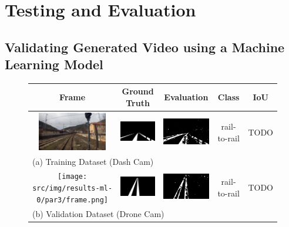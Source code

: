 \chapter{Testing and Evaluation}
\label{chapter:testing-and-evaluation}

\section{Validating Generated Video using a Machine Learning Model}
\label{sec:evaluate-ml}


\begin{figure}
\begin{tabular}{ccccc}
  Frame & Ground Truth & Evaluation & Class & IoU \\ \hline
  \includegraphics[width=30mm]{src/img/results-ml-0/par4/frame.jpg} & 
  \includegraphics[width=30mm]{src/img/results-ml-0/par4/seg.jpeg} & 
  \includegraphics[width=30mm]{src/img/results-ml-0/par4/det.png} &
  rail-to-rail & TODO \\
  \multicolumn{5}{l}{(a) Training Dataset (Dash Cam) } \\ \hline
  
  \texttt{[image: src/img/results-ml-0/par3/frame.png]} & 
  \includegraphics[width=30mm]{src/img/results-ml-0/par3/seg.png} & 
  \includegraphics[width=30mm]{src/img/results-ml-0/par3/det.png} &
  rail-to-rail & TODO \\
  \multicolumn{5}{l}{ (b) Validation Dataset (Drone Cam) } \\ \hline
  

\end{tabular}
\end{figure}
